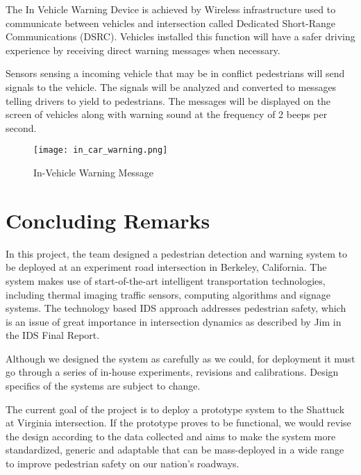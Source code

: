\documentclass{article}
\begin{document}
The In Vehicle Warning Device is achieved by Wireless infrastructure used to communicate between vehicles and intersection called Dedicated Short-Range Communications (DSRC). Vehicles installed this function will have a safer driving experience by receiving direct warning messages when necessary.

Sensors sensing a incoming vehicle that may be in conflict pedestrians will send signals to the vehicle. The signals will be analyzed and converted to messages telling drivers to yield to pedestrians. The messages will be displayed on the screen of vehicles along with warning sound at the frequency of 2 beeps per second.

\begin{figure}
    \centering
    \texttt{[image: in\_car\_warning.png]}
    \caption{In-Vehicle Warning Message}
    \label{fig:veh_warning}
\end{figure}

\section{Concluding Remarks}

In this project, the team designed a pedestrian detection and warning system to be deployed at an experiment road intersection in Berkeley, California. The system makes use of start-of-the-art intelligent transportation technologies, including thermal imaging traffic sensors, computing algorithms and signage systems. The technology based IDS approach addresses pedestrian safety, which is an issue of great importance in intersection dynamics as described by Jim in the IDS Final Report.

Although we designed the system as carefully as we could, for deployment it must go through a series of in-house experiments, revisions and calibrations. Design specifics of the systems are subject to change.

The current goal of the project is to deploy a prototype system to the Shattuck at Virginia intersection. If the prototype proves to be functional, we would revise the design according to the data collected and aims to make the system more standardized, generic and adaptable that can be mass-deployed in a wide range to improve pedestrian safety on our nation's roadways.

\newpage
\theendnotes




% 
% 
    
%     
\end{document}
